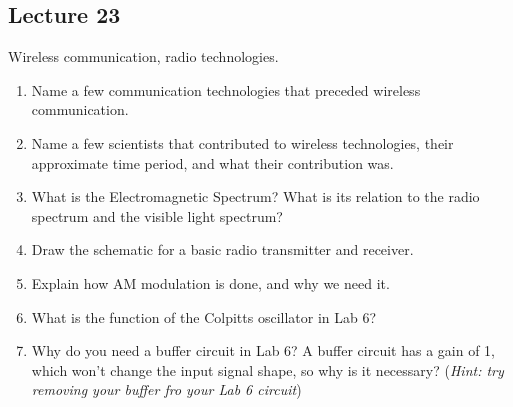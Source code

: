 \subsection*{Lecture 23}

Wireless communication, radio technologies.

\begin{enumerate}
  \item Name a few communication technologies that preceded wireless communication.
  \item Name a few scientists that contributed to wireless technologies, their approximate time period, and what their contribution was.
  \item What is the Electromagnetic Spectrum? What is its relation to the radio spectrum and the visible light spectrum?
  \item Draw the schematic for a basic radio transmitter and receiver.
  \item Explain how AM modulation is done, and why we need it.
  \item What is the function of the Colpitts oscillator in Lab 6?
  \item Why do you need a buffer circuit in Lab 6? A buffer circuit has a gain of 1,
  which won't change the input signal shape, so why is it necessary? (\textit{Hint: try removing your buffer fro your Lab 6 circuit})
\end{enumerate}